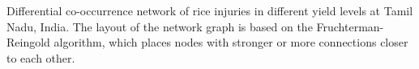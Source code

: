 Differential co-occurrence network of rice injuries in different yield levels at Tamil Nadu, India. The layout of the network graph is based on the Fruchterman-Reingold algorithm, which places nodes with stronger or more connections closer to each other.
\label{fig:difyieldTM}